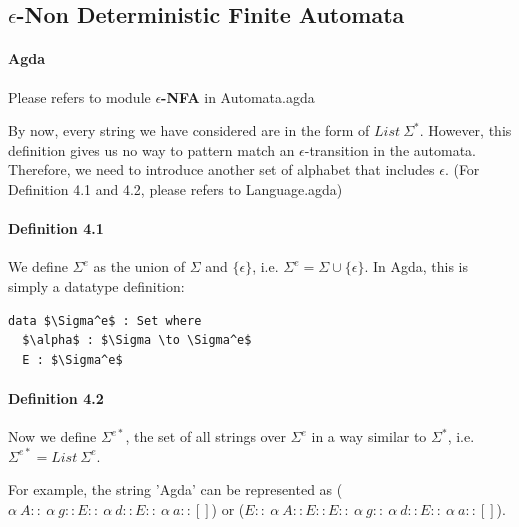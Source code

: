 \documentclass[twoside,openright,final]{bhamthesis}
\begin{document}
\subsection{\(\epsilon\)-Non Deterministic Finite Automata}
\paragraph{Agda} Please refers to module \textbf{\(\epsilon\)-NFA} in
Automata.agda \\

\par By now, every string we have considered are in the form of
\(List\ \Sigma^*\). However, this definition gives us no way to pattern match
an \(\epsilon\)-transition in the automata. Therefore, we need to introduce another
set of alphabet that includes \(\epsilon\). (For Definition 4.1 and
4.2, please refers to Language.agda)

\paragraph{Definition 4.1} We define \(\Sigma^e\) as the union of
\(\Sigma\) and \(\{\epsilon\}\), i.e. \(\Sigma^e = \Sigma \cup
\{\epsilon\}\). In Agda, this is simply a datatype definition:
\begin{lstlisting}[mathescape=true,xleftmargin=.4\textwidth,aboveskip=0pt,belowskip=0pt]
data $\Sigma^e$ : Set where
  $\alpha$ : $\Sigma \to \Sigma^e$
  E : $\Sigma^e$
\end{lstlisting}

\paragraph{Definition 4.2} Now we define \(\Sigma^{e*}\), the set of all strings over
\(\Sigma^e\) in a way similar to \(\Sigma^*\), i.e. \(\Sigma^{e*} =
List\ \Sigma^e\). \\

\par For example, the string 'Agda' can be
represented as (\(\alpha\ A ::\ \alpha\ g :: E ::\ \alpha\ d :: E ::\ \alpha\
a :: []\)) or (\(E ::\ \alpha\ A :: E :: E ::\ \alpha\ g ::\ \alpha\ d :: E ::\ \alpha\
a :: []\)).
\end{document}
